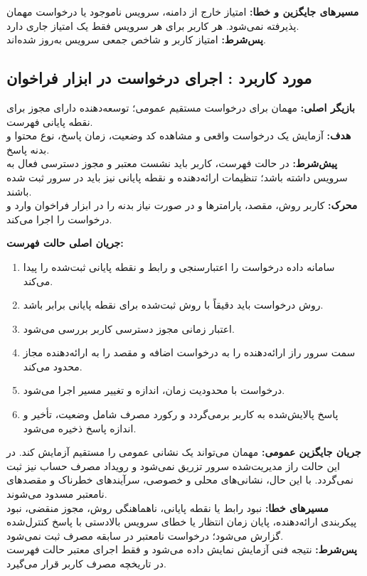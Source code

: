 \noindent\textbf{مسیرهای جایگزین و خطا:}
امتیاز خارج از دامنه، سرویس ناموجود یا درخواست مهمان پذیرفته نمی‌شود. هر کاربر برای هر سرویس فقط یک امتیاز جاری دارد.\\
\textbf{پس‌شرط:} امتیاز کاربر و شاخص جمعی سرویس به‌روز شده‌اند.

\UseCaseStart
\subsection{مورد کاربرد : اجرای درخواست در ابزار فراخوان}
\noindent\textbf{بازیگر اصلی:} مهمان برای درخواست مستقیم عمومی؛ توسعه‌دهنده دارای مجوز برای نقطه پایانی فهرست.\\
\textbf{هدف:} آزمایش یک درخواست واقعی و مشاهده کد وضعیت، زمان پاسخ، نوع محتوا و بدنه پاسخ.\\
\textbf{پیش‌شرط:} در حالت فهرست، کاربر باید نشست معتبر و مجوز دسترسی فعال به سرویس داشته باشد؛ تنظیمات ارائه‌دهنده و نقطه پایانی نیز باید در سرور ثبت شده باشند.\\
\textbf{محرک:} کاربر روش، مقصد، پارامترها و در صورت نیاز بدنه را در ابزار فراخوان وارد و درخواست را اجرا می‌کند.


\noindent\textbf{جریان اصلی حالت فهرست:}
\begin{enumerate}
  \item سامانه داده درخواست را اعتبارسنجی و رابط و نقطه پایانی ثبت‌شده را پیدا می‌کند.
  \item روش درخواست باید دقیقاً با روش ثبت‌شده برای نقطه پایانی برابر باشد.
  \item اعتبار زمانی مجوز دسترسی کاربر بررسی می‌شود.
  \item سمت سرور راز ارائه‌دهنده را به درخواست اضافه و مقصد را به ارائه‌دهنده مجاز محدود می‌کند.
  \item درخواست با محدودیت زمان، اندازه و تغییر مسیر اجرا می‌شود.
  \item پاسخ پالایش‌شده به کاربر برمی‌گردد و رکورد مصرف شامل وضعیت، تأخیر و اندازه پاسخ ذخیره می‌شود.
\end{enumerate}

\noindent\textbf{جریان جایگزین عمومی:}
مهمان می‌تواند یک نشانی عمومی را مستقیم آزمایش کند. در این حالت راز مدیریت‌شده سرور تزریق نمی‌شود و رویداد مصرف حساب نیز ثبت نمی‌گردد. با این حال، نشانی‌های محلی و خصوصی، سرآیندهای خطرناک و مقصدهای نامعتبر مسدود می‌شوند.\\
\textbf{مسیرهای خطا:}
نبود رابط یا نقطه پایانی، ناهماهنگی روش، مجوز منقضی، نبود پیکربندی ارائه‌دهنده، پایان زمان انتظار یا خطای سرویس بالادستی با پاسخ کنترل‌شده گزارش می‌شود؛ درخواست نامعتبر در سابقه مصرف ثبت نمی‌شود.\\
\textbf{پس‌شرط:} نتیجه فنی آزمایش نمایش داده می‌شود و فقط اجرای معتبر حالت فهرست در تاریخچه مصرف کاربر قرار می‌گیرد.

